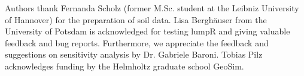 

\begin{acknowledgements}
Authors thank Fernanda Scholz (former M.Sc. student at the Leibniz University of Hannover) for the preparation of soil data.
\DIFdelbegin {}\DIFdelend \DIFaddbegin {}\DIFaddend Lisa Bergh\"auser from the University of Potsdam is acknowledged for testing lumpR \DIFdelbegin {}\DIFdelend and giving valuable feedback and bug reports.
Furthermore, we appreciate the feedback and suggestions on sensitivity analysis by Dr. Gabriele Baroni.
Tobias Pilz acknowledges funding by the Helmholtz graduate school GeoSim.
\end{acknowledgements}







